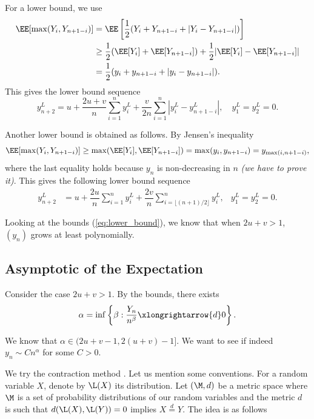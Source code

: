 For a lower bound, we use
\begin{align*}
  \EE[\max(Y_i, Y_{n+1-i})]
   & = \EE\left[\dfrac{1}{2}(Y_i + Y_{n+1-i} + |Y_i - Y_{n+1-i}|)\right]                   \\
   & \ge \dfrac{1}{2}(\EE[Y_i] + \EE[Y_{n+1-i}]) + \dfrac{1}{2}|\EE[Y_i] - \EE[Y_{n+1-i}]| \\
   & = \dfrac{1}{2}(y_i + y_{n+1-i} + |y_i - y_{n+1-i}|).
\end{align*}
This gives the lower bound sequence
\begin{equation}
  \label{eq:lower_bound}
  y_{n+2}^{L} = u + \dfrac{2u+v}{n}\sum_{i=1}^{n}y_i^{L} + \dfrac{v}{2n}\sum_{i=1}^{n}|y_i^{L} - y_{n+1-i}^{L}|, \quad y_1^{L}=y_2^{L}=0.
\end{equation}


\begin{remark}
  Another lower bound is obtained as follows. By Jensen's inequality
  $$\EE[\max(Y_i, Y_{n+1-i})] \ge \max(\EE[Y_i], \EE[Y_{n+1-i}]) = \max(y_i, y_{n+1-i}) = y_{\max(i, n+1-i)},$$
  where the last equality holds because $y_n$ is non-decreasing in $n$ \textit{(we have to prove it)}. This gives the following lower bound sequence
  \begin{align}
    y_{n+2}^{L} & = u + \dfrac{2u}{n}\sum_{i=1}^{n}y_i^{L} + \dfrac{2v}{n}\sum_{i=\lfloor (n+1)/2 \rfloor}^{n}y_{i}^{L}, & y_1^{L}=y_2^{L}=0.
  \end{align}
\end{remark}

Looking at the bounds (\ref{eq:lower_bound}), we know that when $2u+v > 1$, $(y_n)$ grows at least polynomially.

\subsection{Asymptotic of the Expectation}

Consider the case $2u+v>1$. By the bounds,  there exists
$$\alpha = \inf\left\{\beta: \dfrac{Y_n}{n^\beta} \xlongrightarrow{d} 0\right\}.$$

We know that $\alpha \in (2u+v-1, 2(u+v)-1]$. We want to see if indeed $y_n \sim C n^\alpha$ for some $C>0$.

We try the contraction method \cite{ludgercontraction,neininger2004general, drmota2009random}. Let us mention some conventions. For a random variable $X$, denote by $\L(X)$ its distribution. Let $(\M, d)$ be a metric space where $\M$ is a set of probability distributions of our random variables and the metric $d$ is such that $d(\L(X),\L(Y))=0$ implies $X \stackrel{d}{=} Y$. The idea is as follows

